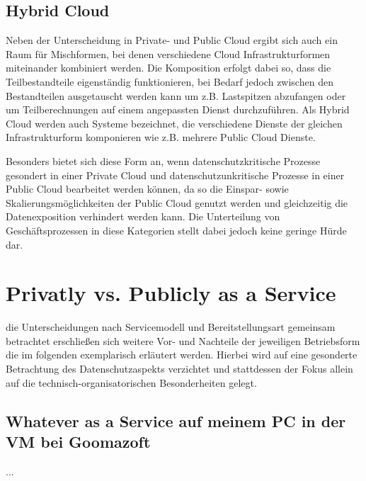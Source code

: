 \subsection{Hybrid Cloud}
Neben der Unterscheidung in Private- und Public Cloud ergibt sich auch ein Raum für Mischformen, bei denen verschiedene Cloud Infrastrukturformen miteinander kombiniert werden. Die Komposition erfolgt dabei so, dass die Teilbestandteile eigenständig funktionieren, bei Bedarf jedoch zwischen den Bestandteilen ausgetauscht werden kann um z.B. Lastspitzen abzufangen oder um Teilberechnungen auf einem angepassten Dienst durchzuführen. Als Hybrid Cloud werden auch Systeme bezeichnet, die verschiedene Dienste der gleichen Infrastrukturform komponieren wie z.B. mehrere Public Cloud Dienste.

Besonders bietet sich diese Form an, wenn datenschutzkritische Prozesse gesondert in einer Private Cloud und datenschutzunkritische Prozesse in einer Public Cloud bearbeitet werden können, da so die Einspar- sowie Skalierungsmöglichkeiten der Public Cloud genutzt werden und gleichzeitig die Datenexposition verhindert werden kann. Die Unterteilung von Geschäftsprozessen in diese Kategorien stellt dabei jedoch keine geringe Hürde dar.

\section{Privatly vs. Publicly as a Service}
\label{sec_privacy_service_models}

 die Unterscheidungen nach Servicemodell und Bereitstellungsart gemeinsam betrachtet erschließen sich weitere Vor- und Nachteile der jeweiligen Betriebsform die im folgenden exemplarisch erläutert werden. Hierbei wird auf eine gesonderte Betrachtung des Datenschutzaspekts verzichtet und stattdessen der Fokus allein auf die technisch-organisatorischen Besonderheiten gelegt. 

\subsection{Whatever as a Service auf meinem PC in der VM bei Goomazoft}
...